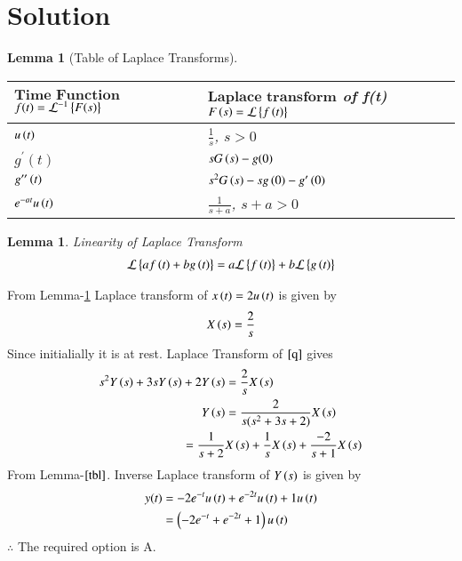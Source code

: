 \documentclass[journal,12pt,twocolumn]{IEEEtran}
\newtheorem{lemma}[theorem]{Lemma}
\begin{document}
\section{Solution}
\begin{lemma}[Table of Laplace Transforms]\label{tbl}
\begin{center}
\begin{tabular}{ |m{3cm}|m{4.5cm}| } 
 \hline
 $\textbf{Time Function}$ $f(t)=\mathcal{L}^{-1}\left\{F(s)\right\}$ & $\textbf{Laplace transform}$ of f(t) $F\left(s\right)=\mathcal{L}\left\{f\left(t\right)\right\}$ \\ 
 \hline
 $u\left(t\right)$ & $\frac{1}{s}$, $s>0$ \\ 
 \hline
 $g^{\prime}(t)$ & $sG\left(s\right)-g(0)$ \\ 
 \hline
 $g^{\prime\prime}\left(t\right)$ & $s^2G\left(s\right)-sg\left(0\right)-g^{\prime}\left(0\right)$\\
 \hline
 $e^{-at}u\left(t\right)$ & $\frac{1}{s+a}$, $s+a>0$\\
 \hline
\end{tabular}
\end{center}
\end{lemma}
\begin{lemma}{Linearity of Laplace Transform}
\begin{align}
    \mathcal{L}\left\{af\left(t\right)+bg\left(t\right)\right\}=a\mathcal{L}\left\{f\left(t\right)\right\}+b\mathcal{L}\left\{g\left(t\right)\right\}
\end{align}
\end{lemma}
From Lemma-\ref{tbl} Laplace transform of $x\left(t\right)=2u\left(t\right)$ is given by
\begin{align}
    X\left(s\right)=\frac{2}{s}
\end{align}
Since initialially it is at rest. Laplace Transform of $\eqref{q}$ gives
\begin{align}
    s^{2}Y\left(s\right)+3sY\left(s\right)+2Y\left(s\right)&=\frac{2}{s}X\left(s\right)\\
    Y\left(s\right)&=\frac{2}{s(s^2+3s+2)}X\left(s\right)\\
    = \frac{1}{s+2}&X\left(s\right)+\frac{1}{s}X\left(s\right)+ \frac{-2}{s+1}X\left(s\right)\label{hc}\\
\end{align}
From Lemma-$\ref{tbl}$. Inverse Laplace transform of $Y\left(s\right)$ is given by
\begin{align}
    y(t)&=-2e^{-t}u\left(t\right)+e^{-2t}u\left(t\right)+1 u\left(t\right)\\
    &=\left(-2e^{-t}+e^{-2t}+1\right)u\left(t\right)
\end{align}
$\therefore$ The required option is A.
\end{document}
